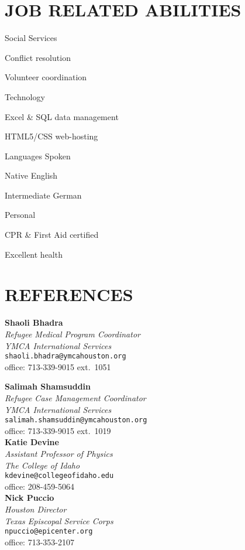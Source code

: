 \documentclass[margin]{res}
\newcommand\reference[5]{\textbf{#1}\\\emph{#2}\\#5\\#3\\}
\begin{document}
\begin{resume}
\section{JOB RELATED ABILITIES} \vspace{0pt}
	\begin{multicols}{2}
		\parskip=0pt
		\begin{skill}{Social Services}
			\item Conflict resolution
			\item Volunteer coordination
		\end{skill}
		\begin{skill}{Technology}
			\item Excel \& SQL data management
			\item HTML5/CSS web-hosting
		\end{skill}
		\begin{skill}{Languages Spoken}
			\item Native English
			\item Intermediate German
		\end{skill}
		\begin{skill}{Personal}
			\item CPR \& First Aid certified
			\item Excellent health
		\end{skill}
	\end{multicols}

\section{REFERENCES} 
		\reference{Shaoli Bhadra}{Refugee Medical Program Coordinator\\YMCA International Services}{office: 713-339-9015 ext.\ 1051}{cell: 704-651-3610}{\texttt{shaoli.bhadra@ymcahouston.org}}
		\parskip=0pt

		\reference{Salimah Shamsuddin}{Refugee Case Management Coordinator\\YMCA International Services}{office: 713-339-9015 ext.\ 1019}{cell: 205-585-0362}{\texttt{salimah.shamsuddin@ymcahouston.org}}
		
		\reference{Katie Devine}{Assistant Professor of Physics\\The College of Idaho}{office: 208-459-5064}{cell: 507-261-9310}{\texttt{kdevine@collegeofidaho.edu}}
		
		\reference{Nick Puccio}{Houston Director\\Texas Episcopal Service Corps}{office: 713-353-2107}{cell: 713-497-7969}{\texttt{npuccio@epicenter.org}}

\end{resume}
\end{document}

